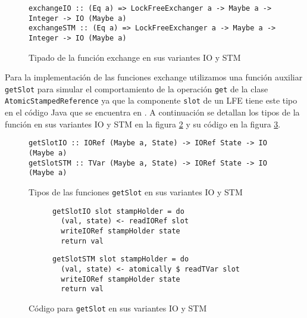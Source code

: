 \begin{figure}[H]
  \centering
  \begin{verbatim}
exchangeIO :: (Eq a) => LockFreeExchanger a -> Maybe a -> Integer -> IO (Maybe a)
exchangeSTM :: (Eq a) => LockFreeExchanger a -> Maybe a -> Integer -> IO (Maybe a)
  \end{verbatim}
  \caption{Tipado de la función exchange en sus variantes IO y STM}
  \label{fig:exchange-types}
\end{figure}

Para la implementación de las funciones exchange utilizamos una función auxiliar \texttt{getSlot} para simular el comportamiento de la operación \texttt{get} de la clase \texttt{AtomicStampedReference}  \cite{asr-java} ya que la componente \texttt{slot} de un LFE tiene este tipo en el código Java que se encuentra en \cite{shavit}. A continuación se detallan los tipos de la función en sus variantes IO y STM en la figura \ref{fig:getSlot-types} y su código en la figura \ref{fig:getSlot-code}.

\begin{figure}[H]
  \centering
  \begin{verbatim}
getSlotIO :: IORef (Maybe a, State) -> IORef State -> IO (Maybe a)
getSlotSTM :: TVar (Maybe a, State) -> IORef State -> IO (Maybe a)
  \end{verbatim}
  \caption{Tipos de las funciones \texttt{getSlot} en sus variantes IO y STM}
  \label{fig:getSlot-types}
\end{figure}

\begin{figure}[H]
  \centering
    \begin{subfigure}[b]{0.4\textwidth}
    \begin{verbatim}
getSlotIO slot stampHolder = do
  (val, state) <- readIORef slot
  writeIORef stampHolder state
  return val
    \end{verbatim}
  \end{subfigure}
  \begin{subfigure}[b]{0.5\textwidth}
    \begin{verbatim}
getSlotSTM slot stampHolder = do
  (val, state) <- atomically $ readTVar slot
  writeIORef stampHolder state
  return val
    \end{verbatim}
  \end{subfigure}
  \caption{Código para \texttt{getSlot} en sus variantes IO y STM}
  \label{fig:getSlot-code}
\end{figure}

